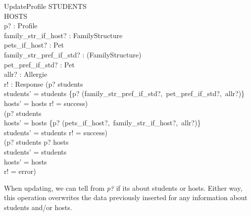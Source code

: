 \documentclass[11pt]{article}
\begin{document}
\begin{schema}{UpdateProfile}
	\Delta STUDENTS\\
	\Delta HOSTS\\
	p? : Profile\\
	family\_str\_if\_host? : FamilyStructure\\
	pets\_if\_host? : \power Pet\\
	family\_str\_pref\_if\_std? : \power (\nat \rightarrow FamilyStructure)\\
	pet\_pref\_if\_std? : \power Pet\\
	allr? : \power Allergie\\
	r! : Response
\where
	(p? \in \dom students \wedge\\
	\indent students' = students \cup \{p? \mapsto (family\_str\_pref\_if\_std?,\ pet\_pref\_if\_std?,\ allr?)\} \wedge\\
	\indent hosts' = hosts \wedge r! = success)\ \vee\\
	(p? \in \dom students \wedge\\
	\indent hosts' = hosts \cup \{p? \mapsto (pets\_if\_host?,\ family\_str\_if\_host?,\ allr?)\} \wedge\\
	\indent students' = students \wedge r! = success)\ \vee\\
	(p? \not\in \dom students \wedge p? \not\in \dom hosts\ \wedge\\
	\indent students' = students\\
	\indent hosts' = hosts\\
	\indent r! = error)
\end{schema}
When updating, we can tell from \emph{p?} if its about students or hosts. Either way, this operation overwrites the data previously inserted for any information about students and/or hosts.
\end{document}
